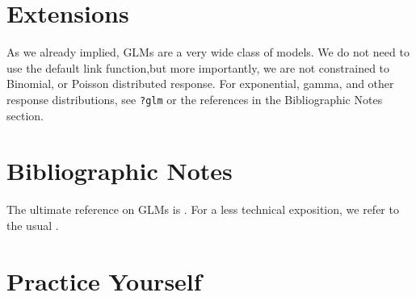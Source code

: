 \documentclass[]{book}
\theoremstyle{definition}
\theoremstyle{definition}
\theoremstyle{definition}
\theoremstyle{remark}
\begin{document}
\section{Extensions}\label{extensions}

As we already implied, GLMs are a very wide class of models. We do not
need to use the default link function,but more importantly, we are not
constrained to Binomial, or Poisson distributed response. For
exponential, gamma, and other response distributions, see \texttt{?glm}
or the references in the Bibliographic Notes section.

\section{Bibliographic Notes}\label{bibliographic-notes-5}

The ultimate reference on GLMs is \citet{mccullagh1984generalized}. For
a less technical exposition, we refer to the usual
\citet{venables2013modern}.

\section{Practice Yourself}\label{practice-glm}
\end{document}
